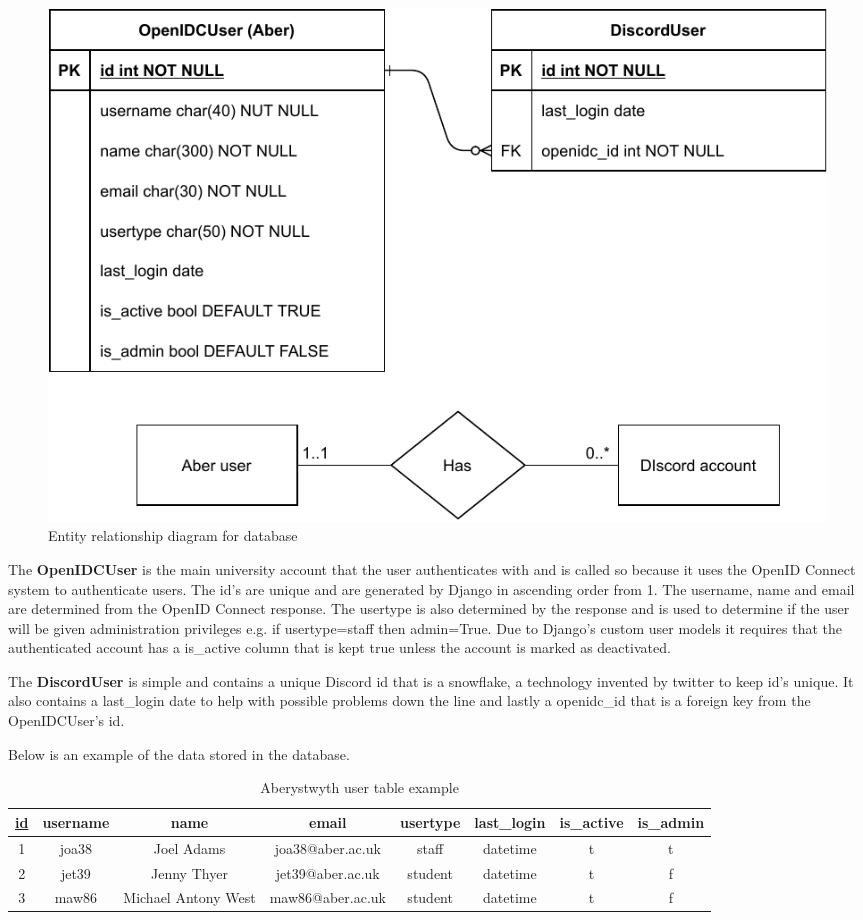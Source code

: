 \begin{figure}[H]
	\centering
	\includegraphics[width=0.8\linewidth]{Figures/database-er-1}
	\caption{Entity relationship diagram for database}
	\label{fig:database-er}
\end{figure}
The \textbf{OpenIDCUser} is the main university account that the user authenticates with and is called so because it uses the OpenID Connect \cite{OpenID} system to authenticate users. The id's are unique and are generated by Django in ascending order from 1. The username, name and email are determined from the OpenID Connect response. The usertype is also determined by the response and is used to determine if the user will be given administration privileges e.g. if usertype=staff then admin=True. Due to Django's custom user models it requires that the authenticated account has a is\_active column that is kept true unless the account is marked as deactivated.

The \textbf{DiscordUser} is simple and contains a unique Discord id that is a snowflake, a technology invented by twitter to keep id's unique. It also contains a last\_login date to help with possible problems down the line and lastly a openidc\_id that is a foreign key from the OpenIDCUser's id.

Below is an example of the data stored in the database.

\begin{table}[H]
	\centering
	\small
	\setlength\tabcolsep{2pt}
	\begin{tabular}{|c|c|c|c|c|c|c|c|}
		\hline
		\underline{id} & username & name & email & usertype & last\_login & is\_active & is\_admin \\
		\hline
		1 & joa38 & Joel Adams & joa38@aber.ac.uk & staff & datetime & t & t \\
		2 & jet39 & Jenny Thyer & jet39@aber.ac.uk & student & datetime & t & f \\
		3 & maw86 & Michael Antony West & maw86@aber.ac.uk & student & datetime & t & f \\
		\hline 
	\end{tabular}
	\caption{Aberystwyth user table example}
	\label{tab:aber-table}
\end{table}

